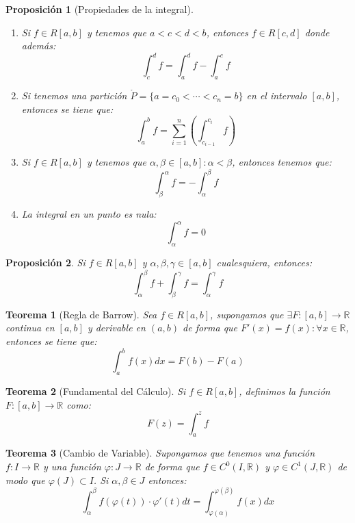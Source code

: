 \documentclass[10pt,a4paper,openright]{book}
\newtheorem{teorema}{Teorema}[chapter]
\newtheorem{proposicion}{Proposición}[chapter]
\begin{document}
\begin{proposicion}[Propiedades de la integral]
\begin{enumerate}
\item Si $f\in R[a,b]$ y tenemos que $a<c<d<b$, entonces $f\in R[c,d]$ donde además:
$$\int_{c}^{d} f = \int_{a}^{d} f - \int_{a}^{c} f$$

\item Si tenemos una partición $\mathring{P} = \{a = c_0 < \cdots < c_n = b\}$ en el intervalo $[a,b]$, entonces se tiene que:
$$\int_{a}^{b} f = \sum_{i = 1}^{n} \left(\int_{c_{i-1}}^{c_i} f\right)$$

\item Si $f\in R[a,b]$ y tenemos que $\alpha,\beta\in [a,b]: \alpha < \beta$, entonces tenemos que:
$$\int_{\beta}^{\alpha} f {=} - \int_{\alpha}^{\beta} f$$
\item La integral en un punto es nula:
$$\int_{\alpha}^{\alpha} f = 0$$
\end{enumerate}
\end{proposicion}

\begin{proposicion}
Si $f\in R[a,b]$ y $\alpha,\beta,\gamma\in [a,b]$ cualesquiera, entonces:
$$\int_{\alpha}^{\beta} f+ \int_{\beta}^{\gamma} f = \int_{\alpha}^{\gamma} f$$
\end{proposicion}

\begin{teorema}[Regla de Barrow]
Sea $f\in R[a,b]$, supongamos que $\exists F: [a,b]\rightarrow\mathbb R$ continua en $[a,b]$ y derivable en $(a,b)$ de forma que $F'(x) = f(x): \forall x\in \mathbb R$, entonces se tiene que:
$$\int_{a}^{b} f(x)dx = F(b)-F(a)$$
\end{teorema}

\begin{teorema}[Fundamental del Cálculo]
Si $f\in R[a,b]$, definimos la función $F:[a,b]\rightarrow \mathbb R$ como:
$$F(z)=\int_{a}^{z} f$$
\end{teorema}

\begin{teorema}[Cambio de Variable]
Supongamos que tenemos una función $f:I\rightarrow \mathbb R$ y una función $\varphi: J\rightarrow \mathbb R$ de forma que $f\in C^0(I,\mathbb R)$ y $\varphi\in C^1(J,\mathbb R)$ de modo que $\varphi(J)\subset I$. Si $\alpha,\beta\in J$ entonces:
$$\int_{\alpha}^{\beta} f(\varphi(t))\cdot \varphi'(t)dt = \int_{\varphi(\alpha)}^{\varphi(\beta)} f(x)dx$$
\end{teorema}
\end{document}
